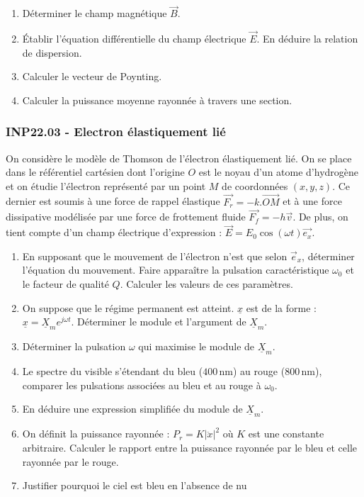 \begin{enumerate}
    \item Déterminer le champ magnétique $\overrightarrow{B}$.
    \item Établir l'équation différentielle du champ électrique $\overrightarrow{E}$. En déduire la relation de dispersion.
    \item Calculer le vecteur de Poynting.
    \item Calculer la puissance moyenne rayonnée à travers une section.
\end{enumerate}

\newpage
\subsubsection*{INP22.03 - Electron élastiquement lié  \lesdeux}

On considère le modèle de Thomson de l'électron élastiquement lié. On se place dans le référentiel cartésien dont l'origine $O$ est le noyau d'un atome d'hydrogène et on étudie l'électron représenté par un point $M$ de coordonnées $(x, y, z)$. Ce dernier est soumis à une force de rappel élastique $\overrightarrow{F_r} = -k. \overrightarrow{OM}$ et à une force dissipative modélisée par une force de frottement fluide $\overrightarrow{F_f} = -h \overrightarrow{v}$. De plus, on tient compte d'un champ électrique d'expression : $\overrightarrow{E} = E_0 \cos(\omega t) \overrightarrow{e_x}$.

\begin{enumerate}
    \item En supposant que le mouvement de l'électron n'est que selon $\overrightarrow{e}_x$, déterminer l'équation du mouvement. Faire apparaître la pulsation caractéristique $\omega_0$ et le facteur de qualité $Q$. Calculer les valeurs de ces paramètres.
    \item On suppose que le régime permanent est atteint. $\underline{x}$ est de la forme : $\underline{x} = \underline{X}_m e^{j\omega t}$. Déterminer le module et l'argument de $\underline{X}_m$.
    \item Déterminer la pulsation $\omega$ qui maximise le module de $\underline{X}_m$.
    \item Le spectre du visible s'étendant du bleu ($400\, \text{nm}$) au rouge ($800\, \text{nm}$), comparer les pulsations associées au bleu et au rouge à $\omega_0$.
    \item En déduire une expression simplifiée du module de $\underline{X}_m$.
    \item On définit la puissance rayonnée : $P_r = K |\ddot{x}|^2$ où $K$ est une constante arbitraire. Calculer le rapport entre la puissance rayonnée par le bleu et celle rayonnée par le rouge.
    \item Justifier pourquoi le ciel est bleu en l'absence de nu

\end{enumerate}

